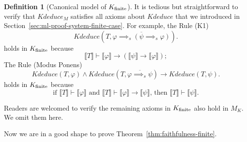 \documentclass[UTF8,11pt]{article}
\newcounter{thmcounter}
\theoremstyle{plain}
\theoremstyle{definition}
\newtheorem{definition} [thmcounter]{Definition}
\theoremstyle{remark}
\newcommand{\Bracket}[1]{\llbracket#1\rrbracket}
\newcommand{\Kdeduce}{\mathit{Kdeduce}}
\begin{document}
\begin{definition}[Canonical model of ${K_\text{finite}}$]
    It is tedious but straightforward to verify that $\Kdeduce_M$ satisfies all axioms about $\Kdeduce$ that we introduced in Section~\cref{sec:ml-proof-system-finite-case}.
    For example, the Rule (K1)
    \begin{equation*}
    \Kdeduce(T, \overline{\varphi \implies_s (\psi \implies_s \varphi)}).
    \end{equation*}
    holds in ${K_\text{finite}}$ because
    $$\Bracket{T} \vdash \Bracket{\varphi} \to (\Bracket{\psi} \to \Bracket{\varphi});$$
    The Rule (Modus Ponens)
    \begin{equation*}
    \Kdeduce(T, \varphi) \wedge \Kdeduce(T, \overline{\varphi \implies_s \psi}) \to 
    \Kdeduce(T, \psi).
    \end{equation*}
    holds in ${K_\text{finite}}$ because
    $$\text{if $\Bracket{T} \vdash \Bracket{\varphi}$ and $\Bracket{T} \vdash \Bracket{\varphi} \to \Bracket{\psi}$, then $\Bracket{T} \vdash \Bracket{\psi}$}.$$
    
    Readers are welcomed to verify the remaining axioms in ${K_\text{finite}}$ also hold in $M_K$.
    We omit them here.
    

\end{definition}


Now we are in a good shape to prove Theorem~\ref{thm:faithfulness-finite}.
\end{document}
